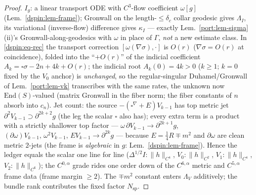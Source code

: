 \begin{proof}
$I_g$: a linear transport ODE with $C^3$-flow coefficient $\omega[g]$
(Lem.~\ref{dspin:lem-frame}); Gronwall on the length-$\le\delta_c$ collar
geodesic gives $\Lambda_I$, its variational (inverse-flow) difference gives
$\kappa_I$ --- exactly Lem.~\ref{port:lem-sigma}(ii)'s Gronwall-along-geodesics
with $\omega$ in place of $\Gamma$, \emph{not} a new estimate class. In
\eqref{dspin:eq-rec} the transport correction $[\omega(\nabla\sigma),\cdot]$ is
$O(r)$ ($\nabla\sigma=O(r)$ at coincidence), folded into the ``$+O(r)$'' of the
indicial coefficient $A_k=\square\sigma-2n+4k+O(r)$; the indicial root
$A_k(0)=4k>0$ ($k\ge1$; $k=0$ fixed by the $V_0$ anchor) is \emph{unchanged},
so the regular-singular Duhamel/Gronwall of Lem.~\ref{port:lem-vk} transcribes
with the same rates, the unknown now $\mathrm{End}(S)$-valued (matrix Gronwall
in the fiber norm; the fiber constants of $n$ absorb into $c_n$). Jet count:
the source $-(\square^\nabla+E)V_{k-1}$ has top metric jet
$\partial^2 V_{k-1}\!\supset\partial^{2k+2}g$ (the leg the scalar $\square$
also has); every extra term is a product with a strictly shallower top factor
--- $\omega\,\partial V_{k-1}\!\to\!\partial^{2k+1}g$,
$(\partial\omega)V_{k-1},\,\omega^2V_{k-1},\,EV_{k-1}\!\to\!\partial^{2k}g$ ---
because $E=\tfrac14R\mp m^2$ and $\partial\omega$ are clean metric $2$-jets
(the frame is \emph{algebraic} in $g$: Lem.~\ref{dspin:lem-frame}). Hence the
ledger equals the scalar one line for line ($\Delta^{1/2}I:\|h\|_{C^4}$,
$V_0:\|h\|_{C^2}$, $V_1:\|h\|_{C^4}$, $V_2:\|h\|_{C^6}$); the $C^{0,\alpha}$
grade rides one order down of the $C^{6,\alpha}$ metric and $C^{5,\alpha}$
frame data (frame margin $\ge2$). The $\mp m^2$ constant enters $\Lambda_V$
additively; the bundle rank contributes the fixed factor $N_{\mathrm{sp}}$.
\end{proof}

